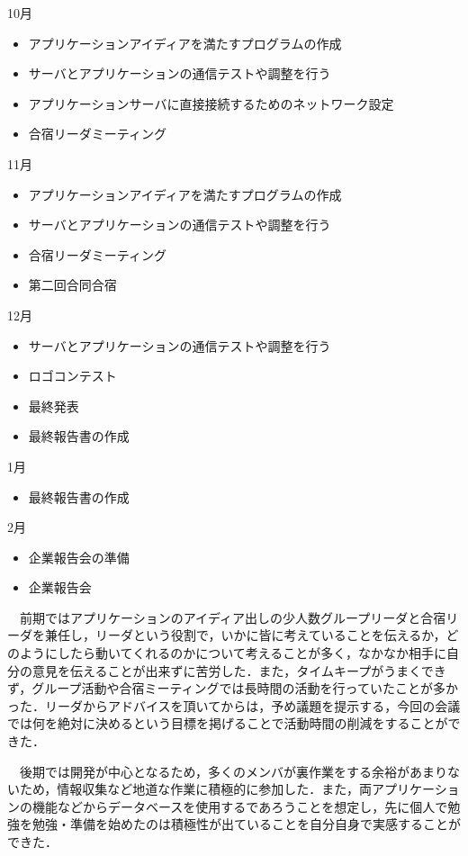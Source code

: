 10月
\begin{itemize}
\item アプリケーションアイディアを満たすプログラムの作成
\item サーバとアプリケーションの通信テストや調整を行う
\item アプリケーションサーバに直接接続するためのネットワーク設定
\item 合宿リーダミーティング
\end{itemize}
11月
\begin{itemize}
\item アプリケーションアイディアを満たすプログラムの作成
\item サーバとアプリケーションの通信テストや調整を行う
\item 合宿リーダミーティング
\item 第二回合同合宿
\end{itemize}
12月
\begin{itemize}
\item サーバとアプリケーションの通信テストや調整を行う
\item ロゴコンテスト
\item 最終発表
\item 最終報告書の作成
\end{itemize}
1月
\begin{itemize}
\item 最終報告書の作成
\end{itemize}
2月
\begin{itemize}
\item 企業報告会の準備
\item 企業報告会
\end{itemize}

\par
　前期ではアプリケーションのアイディア出しの少人数グループリーダと合宿リーダを兼任し，リーダという役割で，いかに皆に考えていることを伝えるか，どのようにしたら動いてくれるのかについて考えることが多く，なかなか相手に自分の意見を伝えることが出来ずに苦労した．また，タイムキープがうまくできず，グループ活動や合宿ミーティングでは長時間の活動を行っていたことが多かった．リーダからアドバイスを頂いてからは，予め議題を提示する，今回の会議では何を絶対に決めるという目標を掲げることで活動時間の削減をすることができた．
\par
　後期では開発が中心となるため，多くのメンバが裏作業をする余裕があまりないため，情報収集など地道な作業に積極的に参加した．また，両アプリケーションの機能などからデータベースを使用するであろうことを想定し，先に個人で勉強を勉強・準備を始めたのは積極性が出ていることを自分自身で実感することができた．

